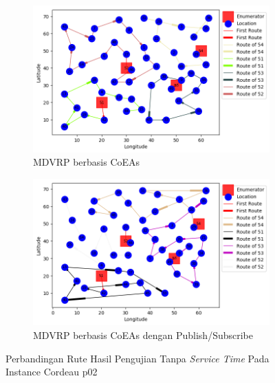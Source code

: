\begin{figure}[H]
	\centering
	\begin{subfigure}[t]{\textwidth}
		\centering
		\includegraphics[width=\textwidth]{Resources/Images/cordeau_p02/cordeau_p02_notw_coes}
		\caption{MDVRP berbasis CoEAs}
		\label{fig:cordeau_p02_notw_coes}
	\end{subfigure}
	\begin{subfigure}[t]{\textwidth}
		\centering
		\includegraphics[width=\textwidth]{Resources/Images/cordeau_p02/cordeau_p02_notw_pubsub_coes}
		\caption{MDVRP berbasis CoEAs dengan Publish/Subscribe}
		\label{fig:cordeau_p02_notw_pubsub_coes}
	\end{subfigure}
	\caption{Perbandingan Rute Hasil Pengujian Tanpa \textit{Service Time} Pada Instance Cordeau p02}
	\label{fig:cordeau_p02_notw}
\end{figure}


